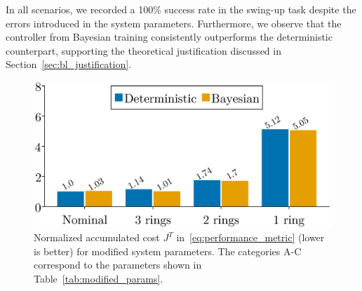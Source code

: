 In all scenarios, we recorded a 100\% success rate in the swing-up task despite
the errors introduced in the system parameters.
%
Furthermore, we observe that the controller from Bayesian training consistently
outperforms the deterministic counterpart, supporting the
theoretical justification discussed in Section~\ref{sec:bl_justification}. 
\begin{figure}[H]
    \centering
    \includegraphics[width=0.7\linewidth]{./figures/idapbc_bar.eps}
    \caption{
        Normalized accumulated cost $J^{T}$ in~\eqref{eq:performance_metric}
        (lower is better) for modified system parameters.
        The categories A-C correspond to the parameters shown in
        Table~\ref{tab:modified_params}.
    }
    \label{fig:neuralidapbc_bar_plot}
\end{figure}
%

